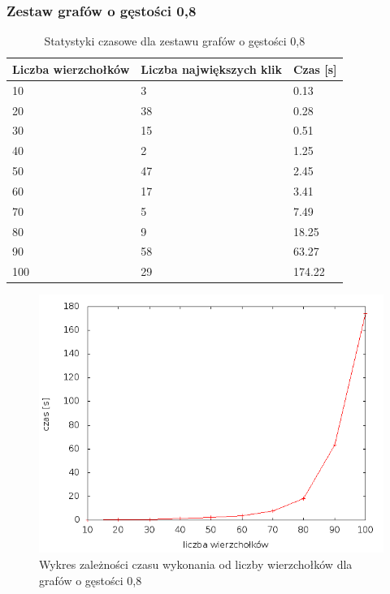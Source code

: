 \documentclass[12pt, a4paper]{article}
\begin{document}
\subsubsection*{Zestaw grafów o gęstości 0,8}
\begin{table}[H]
\caption{Statystyki czasowe dla zestawu grafów o gęstości 0,8}
\begin{center}
    \begin{tabular}{|l|l|l|}
    \hline
    Liczba wierzchołków & Liczba największych klik & Czas [s] \\ \hline
    10 & 3 & 0.13 \\ \hline
    20 & 38 & 0.28 \\ \hline
    30 & 15 & 0.51 \\ \hline
    40 & 2 & 1.25 \\ \hline
    50 & 47 & 2.45 \\ \hline
    60 & 17 & 3.41 \\ \hline
    70 & 5 & 7.49 \\ \hline
    80 & 9 & 18.25 \\ \hline
    90 & 58 & 63.27 \\ \hline
    100 & 29 & 174.22 \\ \hline
    \end{tabular}
\end{center}
\end{table}

\begin{figure}[h]
    \begin{center}
	\includegraphics[scale=0.5]{../experiment_1/img/den/den_08.png}
	\caption{Wykres zależności czasu wykonania od liczby wierzchołków dla grafów o gęstości 0,8}
    \end{center}
\end{figure}
\end{document}
